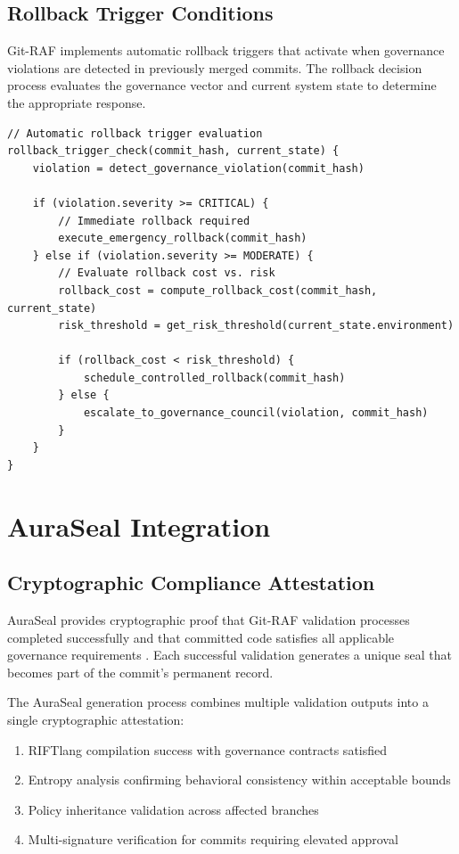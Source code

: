 \subsection{Rollback Trigger Conditions}

Git-RAF implements automatic rollback triggers that activate when governance violations are detected in previously merged commits. The rollback decision process evaluates the governance vector and current system state to determine the appropriate response.

\begin{lstlisting}[style=riftlang, language=rift]
// Automatic rollback trigger evaluation
rollback_trigger_check(commit_hash, current_state) {
    violation = detect_governance_violation(commit_hash)
    
    if (violation.severity >= CRITICAL) {
        // Immediate rollback required
        execute_emergency_rollback(commit_hash)
    } else if (violation.severity >= MODERATE) {
        // Evaluate rollback cost vs. risk
        rollback_cost = compute_rollback_cost(commit_hash, current_state)
        risk_threshold = get_risk_threshold(current_state.environment)
        
        if (rollback_cost < risk_threshold) {
            schedule_controlled_rollback(commit_hash)
        } else {
            escalate_to_governance_council(violation, commit_hash)
        }
    }
}
\end{lstlisting}

\section{AuraSeal Integration}

\subsection{Cryptographic Compliance Attestation}

AuraSeal provides cryptographic proof that Git-RAF validation processes completed successfully and that committed code satisfies all applicable governance requirements \cite{TODO:auraseal-spec}. Each successful validation generates a unique seal that becomes part of the commit's permanent record.

The AuraSeal generation process combines multiple validation outputs into a single cryptographic attestation:

\begin{enumerate}
\item RIFTlang compilation success with governance contracts satisfied
\item Entropy analysis confirming behavioral consistency within acceptable bounds
\item Policy inheritance validation across affected branches
\item Multi-signature verification for commits requiring elevated approval
\end{enumerate}

